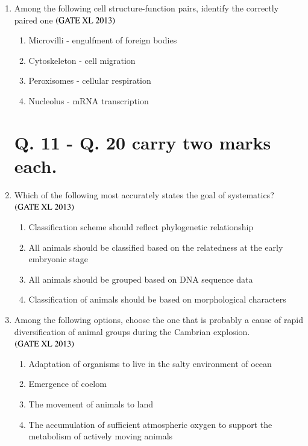 \documentclass[journal]{IEEEtran}
\begin{document}
\begin{enumerate}
\item Among the following cell structure-function pairs, identify the correctly paired one \hfill $\left(\text{GATE XL 2013}\right)$
\begin{enumerate}
    \item Microvilli - engulfment of foreign bodies
    \item Cytoskeleton - cell migration
    \item Peroxisomes - cellular respiration
    \item Nucleolus - mRNA transcription
\end{enumerate}

\section*{Q. 11 - Q. 20 carry two marks each.}

\item Which of the following most accurately states the goal of systematics? \hfill $\left(\text{GATE XL 2013}\right)$
\begin{enumerate}
    \item Classification scheme should reflect phylogenetic relationship
    \item All animals should be classified based on the relatedness at the early embryonic stage
    \item All animals should be grouped based on DNA sequence data
    \item Classification of animals should be based on morphological characters
\end{enumerate}

\item Among the following options, choose the one that is probably a cause of rapid diversification of animal groups during the Cambrian explosion. \hfill $\left(\text{GATE XL 2013}\right)$
\begin{enumerate}
    \item Adaptation of organisms to live in the salty environment of ocean
    \item Emergence of coelom
    \item The movement of animals to land
    \item The accumulation of sufficient atmospheric oxygen to support the metabolism of actively moving animals
\end{enumerate}


\end{enumerate}
\end{document}
